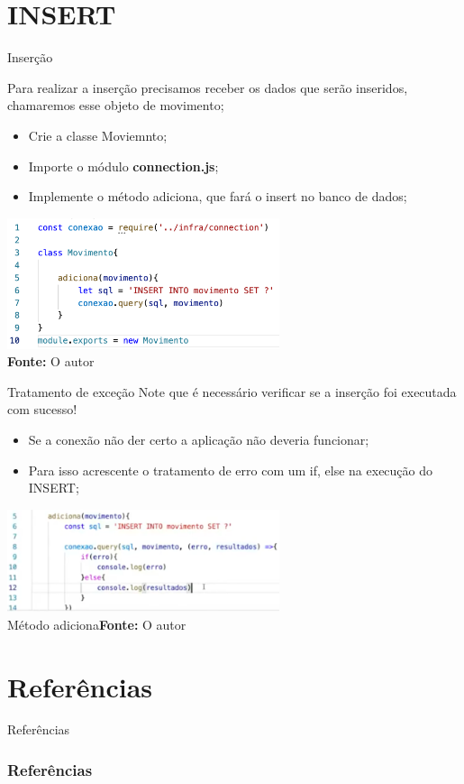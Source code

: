 \documentclass{beamer}
\begin{document}
\section{INSERT}
    \begin{frame}[label=lists]{Inserção}

         Para realizar a inserção precisamos receber os dados que serão inseridos, chamaremos esse objeto de \alert{movimento};
         \begin{itemize}
         \item Crie a classe Moviemnto;
         \item Importe o módulo \textbf{connection.js};
         \item Implemente o método adiciona, que fará o insert no banco de dados;
         \end{itemize}
	            \includegraphics[width=80mm]{aulas/resources/aula10_3.png}\\
            \tiny{\textbf{Fonte:} O autor}
    \end{frame}

    \begin{frame}[label=lists]{Tratamento de exceção}
    Note que é necessário verificar se a inserção foi executada com sucesso!
   \begin{itemize}
       \item Se a conexão não der certo a aplicação não deveria funcionar;
       \item Para isso acrescente o tratamento de erro com um \alert{if, else} na execução do INSERT;
    \end{itemize}
    \begin{center}
    \includegraphics[width=80mm]{aulas/resources/aula10_4.png}\\
            \tiny{Método adiciona\textbf{Fonte:} O autor}
      \end{center}
    \end{frame}

\section{Referências}
    \begin{frame}{Referências}%
\frametitle{Referências}
\small
\begin{center}
\tiny


\end{center}
\end{frame}
  
\end{document}

